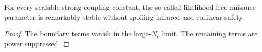 \begin{lemma}\label{thm:2}
For every scalable strong coupling constant, the so-called
likelihood-free nuisance parameter is remarkably stable without spoiling
infrared and collinear safety.
\end{lemma}

\begin{proof}
The boundary terms vanish in the large-$N_c$ limit. The remaining terms
are power suppressed.
\end{proof}

